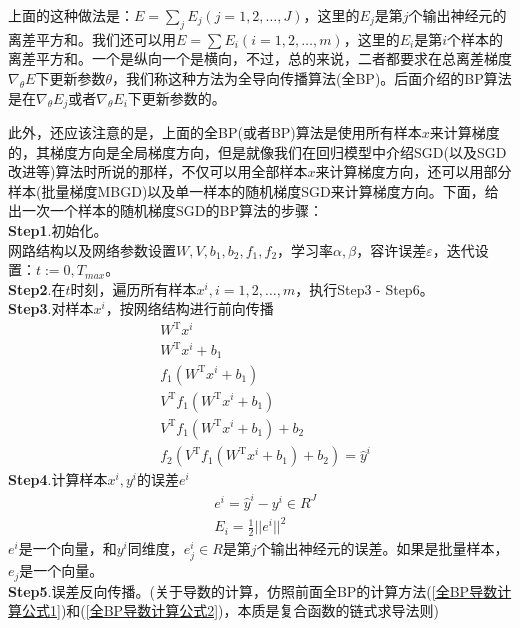             \par
            上面的这种做法是：$E = \sum_j E_j(j = 1,2,\dots,J)$，这里的$E_j$是第$j$个输出神经元的离差平方和。我们还可以用$E = \sum E_i(i = 1,2,\dots,m)$，这里的$E_i$是第$i$个样本的离差平方和。一个是纵向一个是横向，不过，总的来说，二者都要求在总离差梯度$\nabla_\theta E$下更新参数$\theta$，我们称这种方法为全导向传播算法(全BP)。后面介绍的BP算法是在$\nabla_\theta E_j$或者$\nabla_\theta E_i$下更新参数的。
            \par
            此外，还应该注意的是，上面的全BP(或者BP)算法是使用所有样本$x$来计算梯度的，其梯度方向是全局梯度方向，但是就像我们在回归模型中介绍SGD(以及SGD改进等)算法时所说的那样，不仅可以用全部样本$x$来计算梯度方向，还可以用部分样本(批量梯度MBGD)以及单一样本的随机梯度SGD来计算梯度方向。下面，给出一次一个样本的随机梯度SGD的BP算法的步骤：\\
            \textbf{Step1}.初始化。\\
            网路结构以及网络参数设置$W,V,b_1,b_2,f_1,f_2$，学习率$\alpha,\beta$，容许误差$\varepsilon$，迭代设置：$t:=0,T_{max}$。\\
            \textbf{Step2}.在$t$时刻，遍历所有样本$x^i,i=1,2,\dots,m$，执行Step3 - Step6。\\
            \textbf{Step3}.对样本$x^i$，按网络结构进行前向传播
            \begin{align*}
            & W^\mathrm{T}x^i\\
            & W^\mathrm{T}x^i+b_1\\
            & f_1(W^\mathrm{T}x^i+b_1)\\
            & V^\mathrm{T}f_1(W^\mathrm{T}x^i+b_1)\\
            & V^\mathrm{T}f_1(W^\mathrm{T}x^i+b_1)+b_2\\
            & f_2(V^\mathrm{T}f_1(W^\mathrm{T}x^i+b_1)+b_2) = \hat{y}^i
            \end{align*}
            \textbf{Step4}.计算样本$x^i,y^i$的误差$e^i$
            \begin{align*}
            &e^i = \hat{y}^i - y^i \in R^J\\
            &E_i = \frac{1}{2} ||e^i||^2
            \end{align*}
            $e^i$是一个向量，和$y^i$同维度，$e_j^i\in R$是第$j$个输出神经元的误差。如果是批量样本，$e_j$是一个向量。\\
            \textbf{Step5}.误差反向传播。(关于导数的计算，仿照前面全BP的计算方法(\ref{全BP导数计算公式1})和(\ref{全BP导数计算公式2})，本质是复合函数的链式求导法则)
